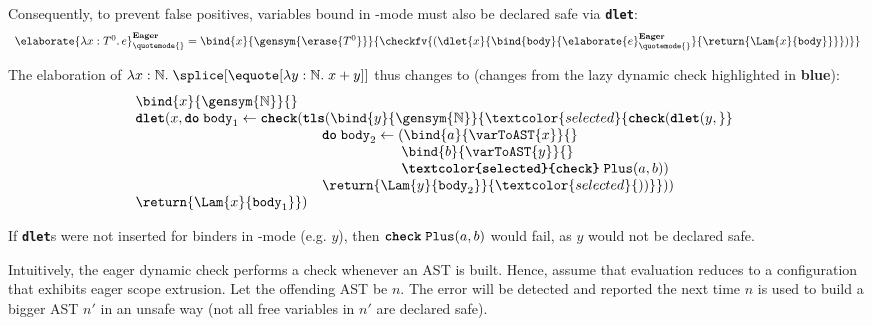 Consequently, to prevent false positives, variables bound in \quotemode{}-mode must also be declared safe via \textbf{\texttt{dlet}}:
{
  \footnotesize
\[
\begin{array}{rcl}
\elaborate{\lambda x: T^0. \, e}_{\quotemode{}}^{\textbf{Eager}} = \bind{x}{\gensym{\erase{T^0}}}{\checkfv{(\dlet{x}{\bind{\texttt{body}}{\elaborate{e}_{\quotemode{}}^\textbf{Eager}}{\return{\Lam{x}{\texttt{body}}}}})}}
\end{array}\]
}

The elaboration of $\lambda x:\mathbb{N}. \; \splice[{\equote[\lambda{y}: \mathbb{N}. \; x+y]}]$ thus changes to (changes from the lazy dynamic check highlighted in \textbf{\textcolor{selected}{blue}}):
{
\[\begin{array}{@{}l}
  \bind{x}{\gensym{\mathbb{N}}}{} \\
  {\textbf{\texttt{dlet}}(}{x}, \textbf{\texttt{do}} \; {\texttt{body}_1} \leftarrow {\textbf{\texttt{check}}(}\textbf{\texttt{tls}}({\bind{y}{\gensym{\mathbb{N}}}{\textcolor{selected}{\textbf{\texttt{check}}(\textbf{\texttt{dlet}}(y,}}} \\
    \quad\quad\quad\quad\quad\quad\quad
    \quad\quad\quad\quad\quad\quad\,\,
    \textbf{\texttt{do}}\;{\texttt{body}_2} \leftarrow {(\bind{a}{\varToAST{x}}{}}\\
    \quad\quad\quad\quad\quad\quad\quad\quad
    \quad\quad\quad\quad\quad\quad\quad\quad
    \quad\quad\quad
    \bind{b}{\varToAST{y}}{}\\
    \quad\quad\quad\quad\quad\quad\quad\quad
    \quad\quad\quad\quad\quad\quad\quad\quad
    \quad\quad\quad
    \textbf{\texttt{\textcolor{selected}{check}}}\;{\texttt{Plus}(a, b)})\\
    \quad\quad\quad\quad\quad\quad\quad
    \quad\quad\quad\quad\quad\quad\,\,
    \return{\Lam{y}{\texttt{body}_2}}{\textcolor{selected}{))}}))\\
  {\return{\Lam{x}{\texttt{body}_1}}})
\end{array}\]
}

If \textbf{\texttt{dlet}}s were not inserted for binders in \quotemode{}-mode (e.g. $y$), then $\textbf{\texttt{check}}\; \texttt{Plus}(a, b)$ would fail, as $y$ would not be declared safe. 

Intuitively, the eager dynamic check performs a check whenever an AST is built. Hence, assume that evaluation reduces to a configuration that exhibits eager scope extrusion. Let the offending AST be $n$. The error will be detected and reported the next time $n$ is used to build a bigger AST $n'$ in an unsafe way (not all free variables in $n'$ are declared safe). 

